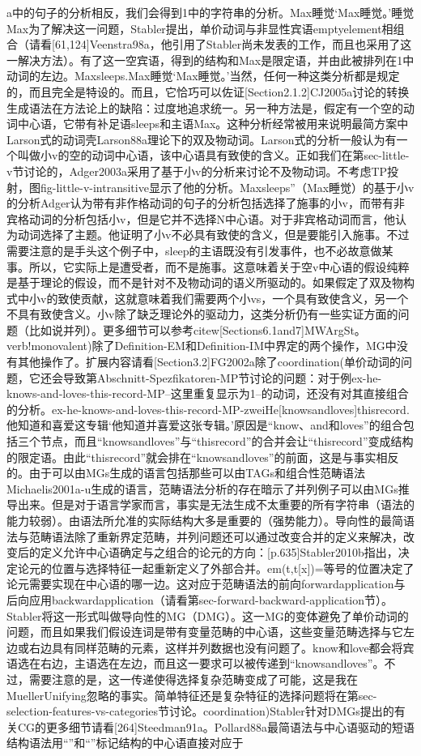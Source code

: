 a中的句子的分析相反，我们会得到1中的字符串的分析。Max睡觉`Max睡觉。'睡觉Max为了解决这一问题，Stabler提出，单价动词与非显性宾语emptyelement相组合（请看[61,124]Veenstra98a，他引用了Stabler尚未发表的工作，而且也采用了这一解决方法）。有了这一空宾语，得到的结构和Max是限定语，并由此被排列在1中动词的左边。Maxsleeps.Max睡觉`Max睡觉。'当然，任何一种这类分析都是规定的，而且完全是特设的。而且，它恰巧可以佐证[Section2.1.2]CJ2005a讨论的转换生成语法在方法论上的缺陷：过度地追求统一。另一种方法是，假定有一个空的动词中心语，它带有补足语sleeps和主语Max。这种分析经常被用来说明最简方案中Larson式的动词壳Larson88a理论下的双及物动词。Larson式的分析一般认为有一个叫做小v的空的动词中心语，该中心语具有致使的含义。正如我们在第sec-little-v节讨论的，Adger2003a采用了基于小v的分析来讨论不及物动词。不考虑TP投射，图fig-little-v-intransitive显示了他的分析。Maxsleeps”（Max睡觉）的基于小v的分析Adger认为带有非作格动词的句子的分析包括选择了施事的小v，而带有非宾格动词的分析包括小v，但是它并不选择N中心语。对于非宾格动词而言，他认为动词选择了主题。他证明了小v不必具有致使的含义，但是要能引入施事。不过需要注意的是手头这个例子中，sleep的主语既没有引发事件，也不必故意做某事。所以，它实际上是遭受者，而不是施事。这意味着关于空v中心语的假设纯粹是基于理论的假设，而不是针对不及物动词的语义所驱动的。如果假定了双及物构式中小v的致使贡献，这就意味着我们需要两个小vs，一个具有致使含义，另一个不具有致使含义。小v除了缺乏理论外的驱动力，这类分析仍有一些实证方面的问题（比如说并列）。更多细节可以参考citew[Sections6.1and7]MWArgSt。verb!monovalent)除了Definition-EM和Definition-IM中界定的两个操作，MG中没有其他操作了。扩展内容请看[Section3.2]FG2002a除了coordination(单价动词的问题，它还会导致第Abschnitt-Spezfikatoren-MP节讨论的问题：对于例ex-he-knows-and-loves-this-record-MP--这里重复显示为1--的动词，还没有对其直接组合的分析。ex-he-knows-and-loves-this-record-MP-zweiHe[knowsandloves]thisrecord.他知道和喜爱这专辑`他知道并喜爱这张专辑。'原因是“know、and和loves”的组合包括三个节点，而且“knowsandloves”与“thisrecord”的合并会让“thisrecord”变成结构的限定语。由此“thisrecord”就会排在“knowsandloves”的前面，这是与事实相反的。由于可以由MGs生成的语言包括那些可以由TAGs和组合性范畴语法Michaelis2001a-u生成的语言，范畴语法分析的存在暗示了并列例子可以由MGs推导出来。但是对于语言学家而言，事实是无法生成不太重要的所有字符串（语法的能力较弱）。由语法所允准的实际结构大多是重要的（强势能力）。导向性的最简语法与范畴语法除了重新界定范畴，并列问题还可以通过改变合并的定义来解决，改变后的定义允许中心语确定与之组合的论元的方向：[p.635]Stabler2010b指出，决定论元的位置与选择特征一起重新定义了外部合并。em(t,t[x])=等号的位置决定了论元需要实现在中心语的哪一边。这对应于范畴语法的前向forwardapplication与后向应用backwardapplication（请看第sec-forward-backward-application节）。Stabler将这一形式叫做导向性的MG（DMG）。这一MG的变体避免了单价动词的问题，而且如果我们假设连词是带有变量范畴的中心语，这些变量范畴选择与它左边或右边具有同样范畴的元素，这样并列数据也没有问题了。know和love都会将宾语选在右边，主语选在左边，而且这一要求可以被传递到“knowsandloves”。不过，需要注意的是，这一传递使得选择复杂范畴变成了可能，这是我在MuellerUnifying忽略的事实。简单特征还是复杂特征的选择问题将在第sec-selection-features-vs-categories节讨论。coordination)Stabler针对DMGs提出的有关CG的更多细节请看[264]Steedman91a。Pollard88a最简语法与中心语驱动的短语结构语法用“”和“”标记结构的中心语直接对应于